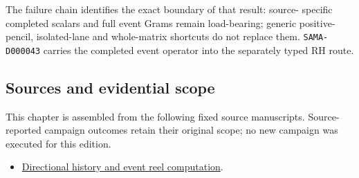 The failure chain identifies the exact boundary of that result: source-
specific completed scalars and full event Grams remain load-bearing;
generic positive-pencil, isolated-lane and whole-matrix shortcuts do not
replace them. \texttt{SAMA-D000043} carries the completed event operator
into the separately typed RH route.

\subsection{Sources and evidential
scope}\label{viii-ch06-sources-and-evidential-scope}

This chapter is assembled from the following fixed source manuscripts.
Source-reported campaign outcomes retain their original scope; no new
campaign was executed for this edition.

\begin{itemize}
\tightlist
\item
  \href{https://github.com/iwtbotiwtwot/SAMA/blob/4c2b5dc1649da5900c90b90d0ce56c223dbb7717/vol_iii/03-writes-and-history/directional-history-and-event-reel-computation.md}{Directional
  history and event reel computation}.
\end{itemize}
